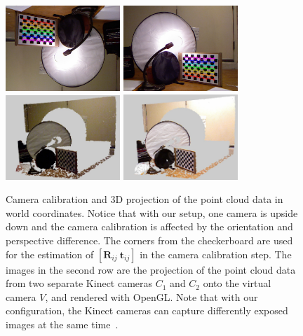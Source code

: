\begin{figure}
\centering
\includegraphics[width=1.7in]{ch4/diagrams/corners01.jpg} 
\includegraphics[width=1.7in]{ch4/diagrams/corners02.jpg} \\
\includegraphics[width=1.7in]{ch4/diagrams/calibration_camera1.jpg} 
\includegraphics[width=1.7in]{ch4/diagrams/calibration_camera2.jpg} \\
\caption{Camera calibration and 3D projection of the point cloud data in world coordinates. Notice that with our setup, one camera is upside down and the camera calibration is affected by the orientation and perspective difference. The corners from the checkerboard are used for the estimation of $[\mathbf{R}_{ij}~\mathbf{t}_{ij}]$ in the camera calibration step. The images in the second row are the projection of the point cloud data from two separate Kinect cameras $C_{1}$ and $C_{2}$ onto the virtual camera $V$, and rendered with OpenGL. Note that with our configuration, the Kinect cameras can capture differently exposed images at the same time~\cite{lo2013three}.}
\label{fig_reproject}
\label{sec_sim_hdr_mul_kinect}
\end{figure}

